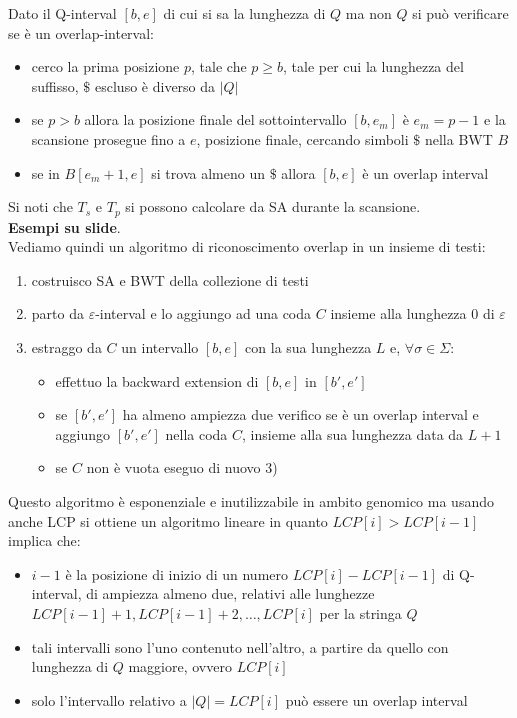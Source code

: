 \documentclass[a4paper,12pt, oneside]{book}
\begin{document}
Dato il Q-interval $[b,e]$ di cui si sa la lunghezza di $Q$ ma non $Q$ si può
verificare se è un overlap-interval:
\begin{itemize}
  \item cerco la prima posizione $p$, tale che $p\geq b$, tale per cui la
  lunghezza del suffisso, $\$$ escluso è diverso da $|Q|$
  \item se $p>b$ allora la posizione finale del sottointervallo $[b,e_m]$ è
  $e_m=p-1$ e la scansione prosegue fino a $e$, posizione finale, cercando
  simboli $\$$ nella BWT $B$
  \item se in $B[e_m+1,e]$ si trova almeno un $\$$ allora $[b,e]$ è un overlap
  interval 
\end{itemize}
Si noti che $T_s$ e $T_p$ si possono calcolare da SA durante la scansione.\\
\textbf{Esempi su slide}.\\
Vediamo quindi un algoritmo di riconoscimento overlap in un insieme di testi:
\begin{enumerate}
  \item costruisco SA e BWT della collezione di testi
  \item parto da $\varepsilon$-interval e lo aggiungo ad una coda $C$ insieme
  alla lunghezza 0 di $\varepsilon$
  \item estraggo da $C$ un intervallo $[b,e]$ con la sua lunghezza $L$ e,
  $\forall \sigma\in\Sigma$:
  \begin{itemize}
    \item effettuo la backward extension di $[b,e]$ in $[b',e']$
    \item se $[b',e']$ ha almeno ampiezza due verifico se è un overlap interval
    e aggiungo $[b',e']$ nella coda $C$, insieme alla sua lunghezza data da
    $L+1$ 
    \item se $C$ non è vuota eseguo di nuovo 3)
  \end{itemize}
\end{enumerate}
Questo algoritmo è esponenziale e inutilizzabile in ambito genomico ma usando
anche LCP si ottiene un algoritmo lineare in quanto $LCP[i] > LCP[i-1]$ implica
che: 
\begin{itemize}
  \item $i-1$ è la posizione di inizio di un numero $LCP[i]-LCP[i-1]$
  di Q-interval, di ampiezza almeno due, relativi alle lunghezze
  $LCP[i-1]+1, LCP[i-1]+2, \ldots,LCP[i]$ per la stringa $Q$ 
  \item tali intervalli sono l'uno contenuto nell'altro, a partire da quello con
  lunghezza di $Q$ maggiore, ovvero $LCP[i]$
  \item solo l'intervallo relativo a $|Q|=LCP[i]$ può essere un overlap interval
\end{itemize}
\end{document}
